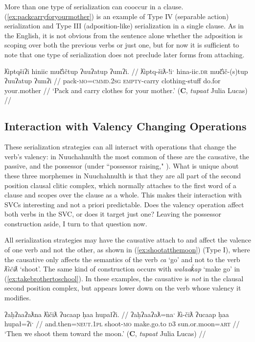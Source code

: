 More than one type of serialization can cooccur in a clause. (\ref{ex:packcarryforyourmother}) is an example of Type IV (separable action) serialization and Type III (adposition-like) serialization in a single clause. As in the English, it is not obvious from the sentence alone whether the adposition is scoping over both the previous verbs or just one, but for now it is sufficient to note that one type of serialization does not preclude later forms from attaching.

\ex \label{ex:packcarryforyourmother}
\begingl
\glpreamble ƛ̓iptqšiʔi hiniic muč̓ičtup ʔuuʔatup ʔumʔi. //
\gla ƛ̓iptq-šiƛ-!iˑ hina-iic.\textsc{dr} muč̓ič-(s)tup ʔuuʔatup ʔumʔi //
\glb pack-\textsc{mo}=\textsc{cmmd.2sg} \textsc{empty}-carry clothing-stuff do.for your.mother //
\glft `Pack and carry clothes for your mother.' (\textbf{C}, \textit{tupaat} Julia Lucas) //
\endgl
\xe

\subsection{Interaction with Valency Changing Operations} \label{ch:sv:valence}

These serialization strategies can all interact with operations that change the verb's valency: in Nuuchahnulth the most common of these are the causative, the passive, and the possessor (under ``possessor raising," \citealt{braithwaite2003}). What is unique about these three morphemes in Nuuchahnulth is that they are all part of the second position clausal clitic complex, which normally attaches to the first word of a clause and scopes over the clause as a whole. This makes their interaction with SVCs interesting and not a priori predictable. Does the valency operation affect both verbs in the SVC, or does it target just one? Leaving the possessor construction aside, I turn to that question now.

All serialization strategies may have the causative attach to and affect the valence of one verb and not the other, as shown in (\ref{ex:shootatthemoon}) (Type I), where the causative only affects the semantics of the verb \textit{ca} `go' and not to the verb \textit{ƛ̓ičiƛ} `shoot'. The same kind of construction occurs with \textit{wałaak̓ap} `make go' in (\ref{ex:takebrothertoschool}). In these examples, the causative is \textit{not} in the clausal second position complex, but appears lower down on the verb whose valency it modifies.

\ex \label{ex:shootatthemoon}
\begingl
\glpreamble ʔaḥʔaaʔaƛna ƛ̓ičiƛ ʔucaap ḥaa hupałʔi. //
\gla ʔaḥʔaaʔaƛ=naˑ ƛ̓i-čiƛ ʔucaap ḥaa hupał=ʔiˑ //
\glb and.then=\textsc{neut.1pl} shoot-\textsc{mo} make.go.to \textsc{d3} sun.or.moon=\textsc{art} //
\glft `Then we shoot them toward the moon.' (\textbf{C}, \textit{tupaat} Julia Lucas) //
\endgl
\xe

